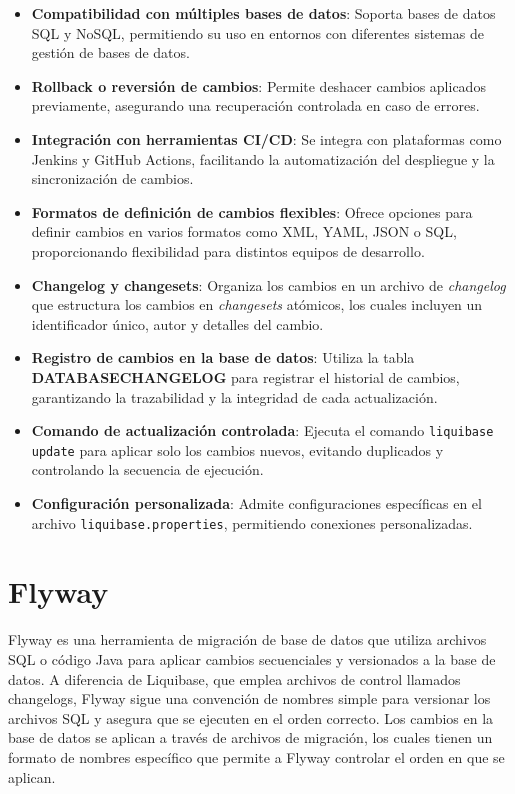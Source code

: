 \documentclass{IEEEtran}
\begin{document}
\begin{itemize}
    \item \textbf{Compatibilidad con múltiples bases de datos}: Soporta bases de datos SQL y NoSQL, permitiendo su uso en entornos con diferentes sistemas de gestión de bases de datos.
    \item \textbf{Rollback o reversión de cambios}: Permite deshacer cambios aplicados previamente, asegurando una recuperación controlada en caso de errores.
    \item \textbf{Integración con herramientas CI/CD}: Se integra con plataformas como Jenkins y GitHub Actions, facilitando la automatización del despliegue y la sincronización de cambios.
    \item \textbf{Formatos de definición de cambios flexibles}: Ofrece opciones para definir cambios en varios formatos como XML, YAML, JSON o SQL, proporcionando flexibilidad para distintos equipos de desarrollo.
    \item \textbf{Changelog y changesets}: Organiza los cambios en un archivo de \textit{changelog} que estructura los cambios en \textit{changesets} atómicos, los cuales incluyen un identificador único, autor y detalles del cambio.
    \item \textbf{Registro de cambios en la base de datos}: Utiliza la tabla \textbf{DATABASECHANGELOG} para registrar el historial de cambios, garantizando la trazabilidad y la integridad de cada actualización.
    \item \textbf{Comando de actualización controlada}: Ejecuta el comando \texttt{liquibase update} para aplicar solo los cambios nuevos, evitando duplicados y controlando la secuencia de ejecución.
    \item \textbf{Configuración personalizada}: Admite configuraciones específicas en el archivo \texttt{liquibase.properties}, permitiendo conexiones personalizadas.
\end{itemize}

\section{Flyway}

Flyway es una herramienta de migración de base de datos que utiliza archivos SQL o código Java para aplicar cambios secuenciales y versionados a la base de datos. A diferencia de Liquibase, que emplea archivos de control llamados changelogs, Flyway sigue una convención de nombres simple para versionar los archivos SQL y asegura que se ejecuten en el orden correcto. Los cambios en la base de datos se aplican a través de archivos de migración, los cuales tienen un formato de nombres específico que permite a Flyway controlar el orden en que se aplican. 
\end{document}
